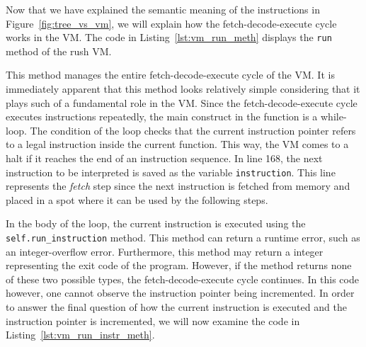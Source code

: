Now that we have explained the semantic meaning of the instructions in Figure~\ref{fig:tree_vs_vm}, we will explain how the fetch-decode-execute cycle works in the VM.
The code in Listing~\ref{lst:vm_run_meth} displays the \texttt{run} method of the rush VM.


This method manages the entire fetch-decode-execute cycle of the VM.
It is immediately apparent that this method looks relatively simple considering that it plays such of a fundamental role in the VM.
Since the fetch-decode-execute cycle executes instructions repeatedly, the main construct in the function is a while-loop.
The condition of the loop checks that the current instruction pointer refers to a legal instruction inside the current function.
This way, the VM comes to a halt if it reaches the end of an instruction sequence.
In line 168, the next instruction to be interpreted is saved as the variable \texttt{instruction}.
This line represents the \emph{fetch} step since the next instruction is fetched from memory and placed in a spot where it can be used by the following steps.

In the body of the loop, the current instruction is executed using the \texttt{self.run\_instruction} method.
This method can return a runtime error, such as an integer-overflow error.
Furthermore, this method may return a integer representing the exit code of the program.
However, if the method returns none of these two possible types, the fetch-decode-execute cycle continues.
In this code however, one cannot observe the instruction pointer being incremented.
In order to answer the final question of how the current instruction is executed and the instruction pointer is incremented, we will now examine the code in Listing~\ref{lst:vm_run_instr_meth}.


